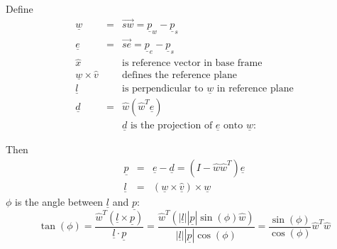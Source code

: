 \documentclass[]{article}
\begin{document}
Define 
\begin{eqnarray}
 \underline{w} & = & \overrightarrow{sw} = \underline{p}_{w}-\underline{p}_{s} \nonumber \\
 \underline{e} & = & \overrightarrow{se} = \underline{p}_{e}-\underline{p}_{s} \nonumber \\
 \hat{x} && \text{is reference vector in base frame} \nonumber \\
 \underline{w}\times\hat{v} && \text{defines the reference plane} \nonumber \\
 \underline{l} && \text{is perpendicular to $\underline{w}$ in reference plane} \nonumber \\
 \underline{d} & = & \hat{w}(\hat{w}^{T}\underline{e}) \nonumber\\
 && \text{$\underline{d}$ is the projection of $\underline{e}$ onto $\underline{w}$}: \nonumber
\end{eqnarray}
\begin{figure}[h!]
	\centering
\end{figure}


Then
\begin{eqnarray}
    \underline{p} & = & \underline{e} - \underline{d} = (I-\hat{w}\hat{w}^{T})\underline{e} \nonumber \\
    \underline{l} & = & (\underline{w} \times \hat{\underline{v}}) \times \underline{w} \nonumber
\end{eqnarray}
$\phi$ is the angle between $\underline{l}$ and $\underline{p}$:
\begin{displaymath}
 \tan(\phi) = \frac{\hat{w}^{T}(\underline{l}\times\underline{p})}{\underline{l} \cdot \underline{p}} = \frac{\hat{w}^{T}\left(|\underline{l}||\underline{p}|\sin(\phi)\hat{w}\right)}{|\underline{l}||\underline{p}|\cos(\phi)} = \frac{\sin(\phi)}{\cos(\phi)}\hat{w}^{T}\hat{w} 
\end{displaymath}
\end{document}
